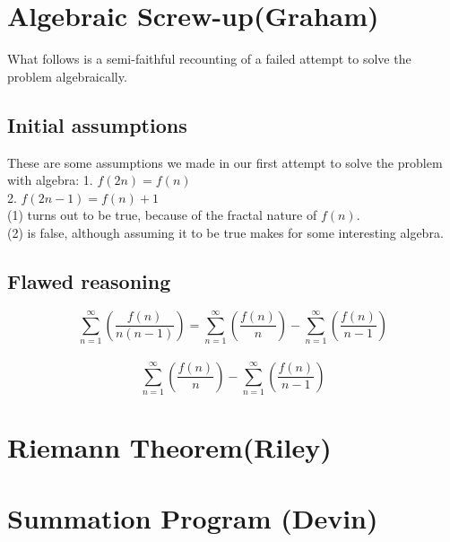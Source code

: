 \documentclass{article}
\begin{document}

\section{Algebraic Screw-up(Graham)}
What follows is a semi-faithful recounting of a failed attempt to solve the problem algebraically.
\subsection{Initial assumptions}
These are some assumptions we made in our first attempt to solve the problem with algebra:
1. $f(2n) = f(n)$\\
2. $f(2n-1) = f(n) + 1$\\

(1) turns out to be true, because of the fractal nature of $f(n)$.\\
(2) is false, although assuming it to be true makes for some interesting algebra.\\

\subsection{Flawed reasoning}
$$\sum_{n=1}^\infty \left( \frac{f(n)}{n(n-1)} \right)=\sum_{n=1}^\infty \left( \frac{f(n)}{n} \right)-\sum_{n=1}^\infty \left( \frac{f(n)}{n-1} \right)$$\\
$$\sum_{n=1}^\infty \left( \frac{f(n)}{n} \right)-\sum_{n=1}^\infty \left( \frac{f(n)}{n-1} \right)$$

\section{Riemann Theorem(Riley)}
\section{Summation Program (Devin)}
\end{document}
